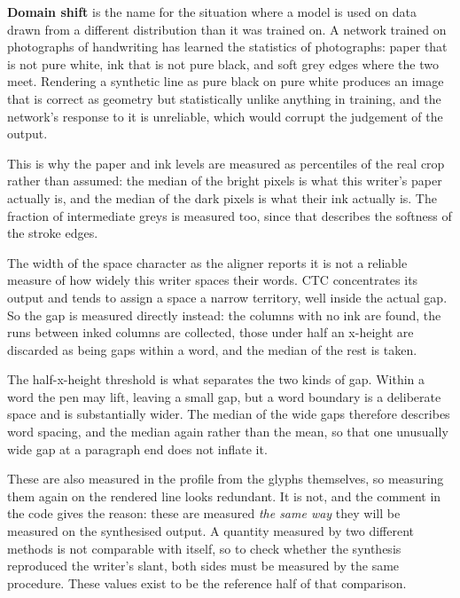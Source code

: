 \textbf{Domain shift} is the name for the situation where a model is used on data drawn from a different distribution than it was trained on. A network trained on photographs of handwriting has learned the statistics of photographs: paper that is not pure white, ink that is not pure black, and soft grey edges where the two meet. Rendering a synthetic line as pure black on pure white produces an image that is correct as geometry but statistically unlike anything in training, and the network's response to it is unreliable, which would corrupt the judgement of the output.

This is why the paper and ink levels are measured as percentiles of the real crop rather than assumed: the median of the bright pixels is what this writer's paper actually is, and the median of the dark pixels is what their ink actually is. The fraction of intermediate greys is measured too, since that describes the softness of the stroke edges.


The width of the space character as the aligner reports it is not a reliable measure of how widely this writer spaces their words. CTC concentrates its output and tends to assign a space a narrow territory, well inside the actual gap. So the gap is measured directly instead: the columns with no ink are found, the runs between inked columns are collected, those under half an x-height are discarded as being gaps within a word, and the median of the rest is taken.

The half-x-height threshold is what separates the two kinds of gap. Within a word the pen may lift, leaving a small gap, but a word boundary is a deliberate space and is substantially wider. The median of the wide gaps therefore describes word spacing, and the median again rather than the mean, so that one unusually wide gap at a paragraph end does not inflate it.


These are also measured in the profile from the glyphs themselves, so measuring them again on the rendered line looks redundant. It is not, and the comment in the code gives the reason: these are measured \emph{the same way} they will be measured on the synthesised output. A quantity measured by two different methods is not comparable with itself, so to check whether the synthesis reproduced the writer's slant, both sides must be measured by the same procedure. These values exist to be the reference half of that comparison.


